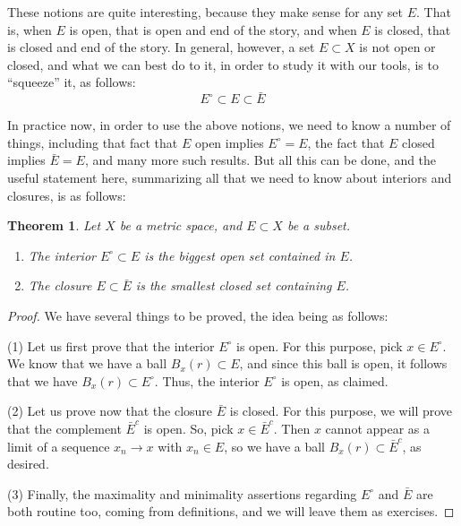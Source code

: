 \documentclass[12pt]{amsbook}
\newtheorem{theorem}{Theorem}[chapter]
\begin{document}
These notions are quite interesting, because they make sense for any set $E$. That is, when $E$ is open, that is open and end of the story, and when $E$ is closed, that is closed and end of the story. In general, however, a set $E\subset X$ is not open or closed, and what we can best do to it, in order to study it with our tools, is to ``squeeze'' it, as follows:
$$E^\circ\subset E\subset\bar{E}$$

In practice now, in order to use the above notions, we need to know a number of things, including that fact that $E$ open implies $E^\circ=E$, the fact that $E$ closed implies $\bar{E}=E$, and many more such results. But all this can be done, and the useful statement here, summarizing all that we need to know about interiors and closures, is as follows:

\begin{theorem}
Let $X$ be a metric space, and $E\subset X$ be a subset.
\begin{enumerate}
\item The interior $E^\circ\subset E$ is the biggest open set contained in $E$.

\item The closure $E\subset\bar{E}$ is the smallest closed set containing $E$.
\end{enumerate}
\end{theorem}

\begin{proof}
We have several things to be proved, the idea being as follows:

\medskip

(1) Let us first prove that the interior $E^\circ$ is open. For this purpose, pick $x\in E^\circ$. We know that we have a ball $B_x(r)\subset E$, and since this ball is open, it follows that we have  $B_x(r)\subset E^\circ$. Thus, the interior $E^\circ$ is open, as claimed.

\medskip

(2) Let us prove now that the closure $\bar{E}$ is closed. For this purpose, we will prove that the complement $\bar{E}^c$ is open. So, pick $x\in\bar{E}^c$. Then $x$ cannot appear as a limit of a sequence $x_n\to x$ with $x_n\in E$, so we have a ball $B_x(r)\subset \bar{E}^c$, as desired.

\medskip

(3) Finally, the maximality and minimality assertions regarding $E^\circ$ and $\bar{E}$ are both routine too, coming from definitions, and we will leave them as exercises.
\end{proof}
\end{document}
